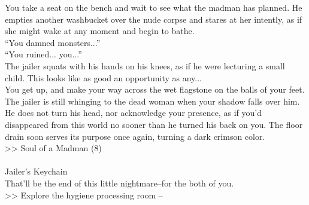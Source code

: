 You take a seat on the bench and wait to see what the madman has planned. He empties another washbucket over the nude corpse and stares at her intently, as if she might wake at any moment and begin to bathe.\\

“You damned monsters...”\\

“You ruined... you...”\\

The jailer squats with his hands on his knees, as if he were lecturing a small child. This looks like as good an opportunity as any...\\

You get up, and make your way across the wet flagstone on the balls of your feet. The jailer is still whinging to the dead woman when your shadow falls over him. He does not turn his head, nor acknowledge your presence, as if you’d disappeared from this world no sooner than he turned his back on you. The floor drain soon serves its purpose once again, turning a dark crimson color.\\
>> Soul of a Madman (8)\\
\\
 Jailer’s Keychain\\

That’ll be the end of this little nightmare--for the both of you.\\

>> Explore the hygiene processing room -- 